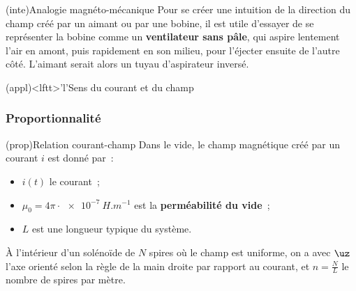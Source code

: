 \documentclass[../../main/main.tex]{subfiles}
\begin{document}
\begin{tcb*}(inte){Analogie magnéto-mécanique}
  Pour se créer une intuition de la direction du champ créé par un aimant ou par
  une bobine, il est utile d'essayer de se représenter la bobine comme un
  \textbf{ventilateur sans pâle}, qui aspire lentement l'air en amont, puis
  rapidement en son milieu, pour l'éjecter ensuite de l'autre côté. L'aimant
  serait alors un tuyau d'aspirateur inversé.
\end{tcb*}

\begin{tcb}(appl)<lftt>'l'{Sens du courant et du champ}
	\centering
\end{tcb}

\subsubsection{Proportionnalité}
\label{sssec:prop}
\begin{tcb*}[sidebyside, righthand ratio=.35](prop){Relation courant-champ}
  Dans le vide, le champ magnétique créé par un courant $i$ est donné par~:
  \psw{%
    \[
    \boxed{\norm{\Bf} = \mu_0 \frac{i(t)}{L}}
  \]
  }%
  \vspace{-15pt}
\begin{itemize}
  \item $i (t)$ le courant~;
  \item $\mu_0 = 4\pi\cdot \SI{e-7}{H.m ^{-1}}$ est la \textbf{perméabilité du
          vide}~;
  \item $L$ est une longueur typique du système.
\end{itemize}
\tcblower
À l'intérieur d'un solénoïde de $N$ spires où le champ est uniforme, on a
\psw{%
  \[
  \boxed{\Bf = \mu_0ni (t)\uz}
\]
}%
avec $\uz$ l'axe orienté selon la règle de la main droite par
rapport au courant, et $n = \frac{N}{L}$ le nombre de spires par mètre.
\end{tcb*}
\end{document}
